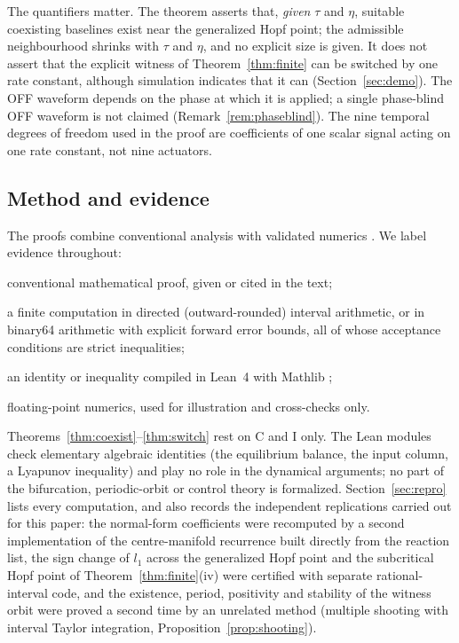 \documentclass[11pt,a4paper]{article}
\theoremstyle{plain}
\theoremstyle{definition}
\theoremstyle{remark}
\newcommand{\evC}{\textsf{C}}
\newcommand{\evI}{\textsf{I}}
\newcommand{\evK}{\textsf{K}}
\newcommand{\evN}{\textsf{N}}
\begin{document}
The quantifiers matter. The theorem asserts that, \emph{given} $\tau$ and $\eta$, suitable coexisting baselines exist near the generalized Hopf point; the admissible neighbourhood shrinks with $\tau$ and $\eta$, and no explicit size is given. It does not assert that the explicit witness of Theorem~\ref{thm:finite} can be switched by one rate constant, although simulation indicates that it can (Section~\ref{sec:demo}). The OFF waveform depends on the phase at which it is applied; a single phase-blind OFF waveform is not claimed (Remark~\ref{rem:phaseblind}). The nine temporal degrees of freedom used in the proof are coefficients of one scalar signal acting on one rate constant, not nine actuators.

\subsection{Method and evidence}\label{sec:evidence}
The proofs combine conventional analysis with validated numerics \cite{Tucker11,vandenBergLessard15}. We label evidence throughout:
\begin{description}[leftmargin=2.2em,labelwidth=1.6em,itemsep=1pt]
\item[\evC] conventional mathematical proof, given or cited in the text;
\item[\evI] a finite computation in directed (outward-rounded) interval arithmetic, or in binary64 arithmetic with explicit forward error bounds, all of whose acceptance conditions are strict inequalities;
\item[\evK] an identity or inequality compiled in Lean~4 with Mathlib \cite{MouraUllrich21,Mathlib20};
\item[\evN] floating-point numerics, used for illustration and cross-checks only.
\end{description}
Theorems~\ref{thm:coexist}--\ref{thm:switch} rest on \evC{} and \evI{} only. The Lean modules check elementary algebraic identities (the equilibrium balance, the input column, a Lyapunov inequality) and play no role in the dynamical arguments; no part of the bifurcation, periodic-orbit or control theory is formalized. Section~\ref{sec:repro} lists every computation, and also records the independent replications carried out for this paper: the normal-form coefficients were recomputed by a second implementation of the centre-manifold recurrence built directly from the reaction list, the sign change of $l_1$ across the generalized Hopf point and the subcritical Hopf point of Theorem~\ref{thm:finite}(iv) were certified with separate rational-interval code, and the existence, period, positivity and stability of the witness orbit were proved a second time by an unrelated method (multiple shooting with interval Taylor integration, Proposition~\ref{prop:shooting}).
\end{document}
